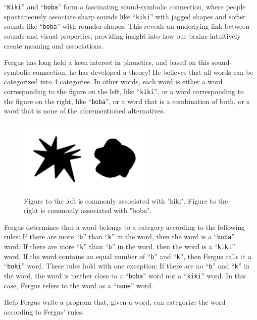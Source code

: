 \noindent
``\texttt{Kiki}'' and ``\texttt{boba}'' form a fascinating sound-symbolic connection, where people spontaneously associate sharp sounds like ``\texttt{kiki}'' 
with jagged shapes and softer sounds like ``\texttt{boba}'' with rounder shapes. 
This reveals an underlying link between sounds and visual properties, 
providing insight into how our brains intuitively create meaning and associations.

Fergus has long held a keen interest in phonetics, and based on this sound-symbolic connection, he has developed a theory! 
He believes that all words can be categorized into 4 categories. In other words, each word is either a word corresponding to the 
figure on the left, like ``\texttt{kiki}'', or a word corresponding to the figure on the right, like ``\texttt{boba}'', or a word 
that is a combination of both, or a word that is none of the aforementioned alternatives.

\begin{figure}[h]
  \centering
\includegraphics[width=0.6\textwidth]{kikiboba.png}
  \caption{Figure to the left is commonly associated with "kiki". Figure to the right is commonly associated with "boba".}
  \label{fig:kikiboba}
\end{figure}

Fergus determines that a word belongs to a category according to the following rules:
If there are more ``\texttt{b}'' than ``\texttt{k}'' in the word, then the word is a ``\texttt{boba}'' word.
If there are more ``\texttt{k}'' than ``\texttt{b}'' in the word, then the word is a ``\texttt{kiki}'' word.
If the word contains an equal number of ``\texttt{b}'' and ``\texttt{k}'', then Fergus calls it a ``\texttt{boki}'' word.
These rules hold with one exception:
If there are no ``\texttt{b}'' and ``\texttt{k}'' in the word, the word is neither close to a ``\texttt{boba}'' word nor a ``\texttt{kiki}'' word. In this case, Fergus refers to the word as a ``\texttt{none}'' word.

Help Fergus write a program that, given a word, can categorize the word according to Fergus' rules.

